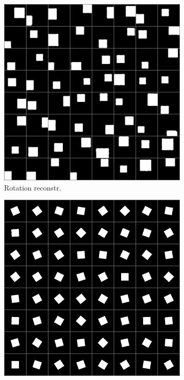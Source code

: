 \documentclass[10pt,a4paper]{article}
\begin{document}
\begin{figure}[!ht]
\begin{subfigure}{0.49\textwidth}
	\includegraphics[width=\textwidth]{square_output1.png}
	\caption{Rotation reconstr.}
	\label{sq_rrec}
\end{subfigure}
\begin{subfigure}{0.49\textwidth}
	\centering
	\includegraphics[width=\textwidth] {square_target0.png}

\end{subfigure}
\end{figure}
\end{document}
